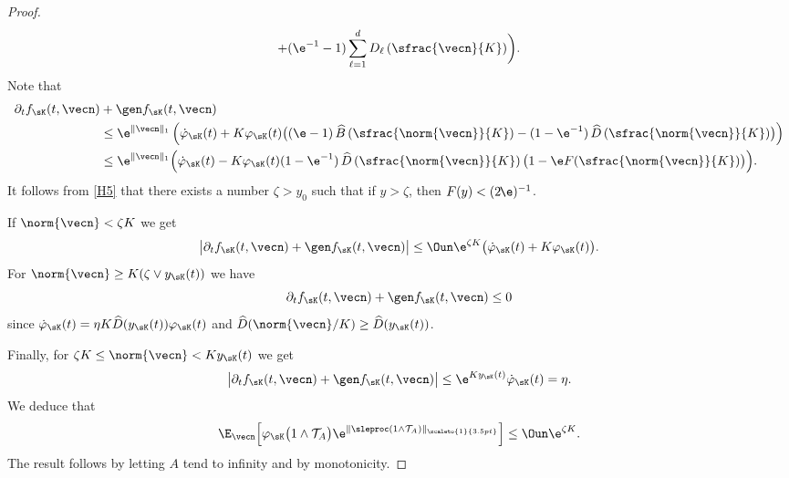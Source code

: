 \begin{proof}
\begin{multline*}
+(\e^{-1}-1)\sum_{\ell=1}^{d}D_{\ell}\left(\sfrac{\vecn}{K}\right)\biggr).
\end{multline*}
Note that
\begin{align*}
\partial_{t}f_{\sK}(t,\vecn)&+\gen f_{\sK}(t,\vecn)\\
& \leq \e^{\|\vecn\|_{1}}\left(\dot\varphi_{\sK}(t)
+ K\varphi_{\sK}(t) \bigl((\e-1)\,\widehat{B}\left(\sfrac{\norm{\vecn}}{K}\right)-(1-\e^{-1})\,\widehat{D}\left(\sfrac{\norm{\vecn}}{K}\right)\bigr)\right)
\\
&\leq
\e^{\|\vecn\|_{1}}\Bigl(\dot\varphi_{\sK}(t)- K\varphi_{\sK}(t)(1-\e^{-1})\,\widehat{D}\left(\sfrac{\norm{\vecn}}{K}\right)
\bigl(1 - \e F(\sfrac{\norm{\vecn}}{K})\bigr)\Bigr).
\end{align*}
It follows from \eqref{H5} that there exists a number $\zeta>y_{0}$ such that if $y>\zeta$, then $F(y)<(2 \hspace{-1pt}\e)^{-1}$.

If $\norm{\vecn}<\zeta K$ we get
\[
\big|\partial_{t}f_{\sK}(t,\vecn)+\gen f_{\sK}(t,\vecn)\big|\le
\Oun \e^{\zeta K}\bigl(\dot\varphi_{\sK}(t)+K\varphi_{\sK}(t)\bigr).
\]
For $\norm{\vecn}\ge K(\zeta\vee y_{\sK}(t))$ we have
\[
\partial_{t}f_{\sK}(t,\vecn)+\gen f_{\sK}(t,\vecn)\le 0
\]
since $\dot\varphi_{\sK}(t) = \eta K \widehat{D}(y_{\sK}(t))\varphi_{\sK}(t)$ and $\widehat{D}(\norm{\vecn}/K)\geq \widehat{D}(y_{\sK}(t))$.

Finally, for $\zeta K\le \norm{\vecn}<K y_{\sK}(t)$ we get
\[
\big|\partial_{t}f_{\sK}(t,\vecn)+\gen f_{\sK}(t,\vecn)\big|\le \e^{K y_{\sK}(t)}\dot\varphi_{\sK}(t) = \eta.
\]
We deduce that
\[
\E_{\vecn}\Bigl[\varphi_{\sK}\bigl(1\wedge \mathcal{T}_A\bigr)\e^{\|\sleproc(1\wedge \mathcal{T}_A)\|_{\scaleto{1}
{3.5pt}}}\Bigr]
\le \Oun \e^{\zeta K}.
\]
The result follows by letting $A$ tend to infinity and by monotonicity.
\end{proof}

